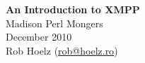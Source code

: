 \begin{titlepage}
\vspace*{\fill}
\begin{center}
{\huge \bfseries An Introduction to XMPP} \\[0.5cm]
{\LARGE Madison Perl Mongers} \\[0.5cm]
{\large December 2010} \\[1.0cm]
{\large Rob Hoelz (\href{mailto:rob@hoelz.ro}{rob@hoelz.ro})}
\end{center}
\vspace*{\fill}
\end{titlepage}
